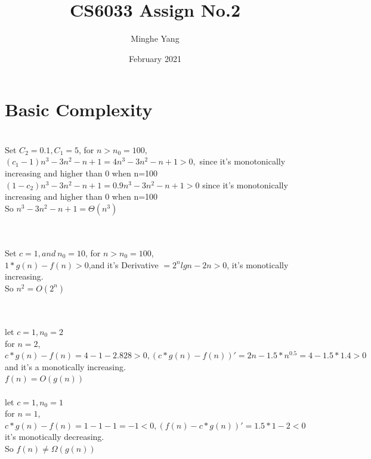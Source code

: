 \documentclass{article}
\title{CS6033 Assign No.2}
\author{Minghe Yang }
\date{February 2021}
\begin{document}
\renewcommand{\algorithmicrequire}{\textbf{Input:}} 
\renewcommand{\algorithmicensure}{\textbf{Output:}}
\maketitle

\section{Basic Complexity}

\\
Set $C_2 =0.1, C_1 = 5$, for $n >n_0 = 100,$
\\
$ (c_1-1)n^3-3n^2-n+1= 4n^3-3n^2-n+1 >0,$ since it's monotonically increasing and higher than 0 when n=100
\\$(1-c_2)n^3-3n^2-n+1= 0.9n^3-3n^2-n+1 >0$ since it's monotonically increasing and higher than 0 when n=100
\\So $n^3 -3n^2 - n + 1 = \Theta (n^3)$
\\\\
\\Set $c = 1, and \ n_0=10$, for $n >n_0 = 100$,
\\$1*g(n)-f(n)>0$,and it's Derivative $= 2^n lgn-2n >0$, it's monotically increasing.
\\So $n^2 = O(2^n)$
\\\\
\\let $c=1, n_0 =2$
\\for $n=2$, $c*g(n)-f(n)=4-1-2.828>0,(c*g(n)-f(n))' =2n-1.5*n^0.5 = 4-1.5*1.4>0$ and it's a monotically increasing.
\\$f(n) = O (g(n))$
\\
\\let $c=1, n_0 =1$
\\for $n=1$, $c*g(n)-f(n)=1-1-1=-1<0,(f(n)-c*g(n))'= 1.5*1-2<0$ it's monotically decreasing.
\\So $f(n) \neq \Omega (g(n))$
\\\\
\end{document}

